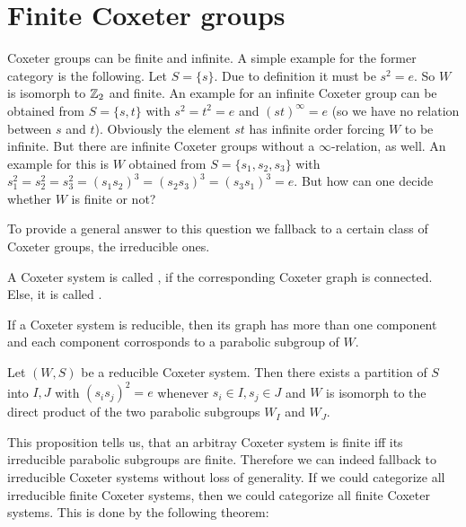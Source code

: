 \section{Finite Coxeter groups}
\label{sec:coxeter-groups-finite}

Coxeter groups can be finite and infinite. A simple example for the former category is the following. Let $S = \{ s \}$. Due to definition it must be $s^2 = e$. So $W$ is isomorph to $\mathbb{Z}_2$ and finite. An example for an infinite Coxeter group can be obtained from $S = \{s,t\}$ with $s^2=t^2=e$ and $(st)^\infty = e$ (so we have no relation between $s$ and $t$). Obviously the element $st$ has infinite order forcing $W$ to be infinite. But there are infinite Coxeter groups without a $\infty$-relation, as well. An example for this is $W$ obtained from $S=\{s_1,s_2,s_3\}$ with $s_1^2=s_2^2=s_3^2=(s_1 s_2)^3=(s_2 s_3)^3=(s_3 s_1)^3=e$. But how can one decide whether $W$ is finite or not?

To provide a general answer to this question we fallback to a certain class of Coxeter groups, the irreducible ones.

\begin{defi}
	A Coxeter system is called , if the corresponding Coxeter graph is connected. Else, it is called .
\end{defi}

If a Coxeter system is reducible, then its graph has more than one component and each component corrosponds to a parabolic subgroup of $W$. 

\begin{prop}
	Let $(W,S)$ be a reducible Coxeter system. Then there exists a partition of $S$ into $I,J$ with $(s_i s_j)^2 = e$ whenever $s_i \in I, s_j \in J$ and $W$ is isomorph to the direct product of the two parabolic subgroups $W_I$ and $W_J$.
\end{prop}

This proposition tells us, that an arbitray Coxeter system is finite iff its irreducible parabolic subgroups are finite. Therefore we can indeed fallback to irreducible Coxeter systems without loss of generality. If we could categorize all irreducible finite Coxeter systems, then we could categorize all finite Coxeter systems. This is done by the following theorem:

